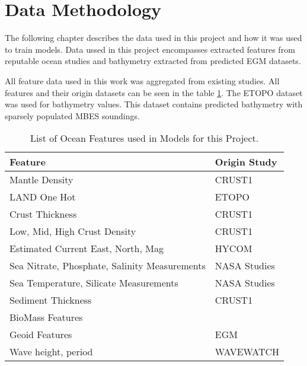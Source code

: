 \section{Data Methodology}
\setlength{\parindent}{10ex}
The following chapter describes the data used in this project and how it was used to train models.
Data ussed in this project encompasses extracted features from reputable ocean studies and bathymetry extracted from predicted \ac{EGM} datasets.



All feature data used in this work was aggregated from existing studies.
All features and their origin datasets can be seen in the table \ref{table:FEATURE_LIST}. %
The ETOPO dataset was used for bathymetry values.
This dataset contains predicted bathymetry with sparsely populated \ac{MBES} soundings.

%

\begin{table}[htb]
    \centering
    \begin{tabular}{ |p{} p{}| }
        \hline
            \textbf{Feature} & \textbf{Origin Study} \\
            \hline
            Mantle Density & CRUST1 \cite{laske2013update} \\
            LAND One Hot & ETOPO \cite{national1988etopo} \\
            Crust Thickness & CRUST1 \cite{laske2013update} \\
            Low, Mid, High Crust Density & CRUST1 \cite{laske2013update} \\
            Estimated Current East, North, Mag & HYCOM \cite{chassignet2009us} \\
            Sea Nitrate, Phosphate, Salinity Measurements & NASA Studies \cite{meissner2018salinity} \cite{parekh2005decoupling}  \\
            Sea Temperature, Silicate Measurements & NASA Studies \\
            Sediment Thickness & CRUST1 \cite{laske2013update} \\
            BioMass Features & \cite{wei2010global} \\
            Geoid Features & EGM \cite{pavlis2008earth} \\
            Wave height, period & WAVEWATCH \cite{tolman20072007} \\
        \hline
    \end{tabular}
    \label{table:FEATURE_LIST}
    \caption{List of Ocean Features used in Models for this Project.}
\end{table}
